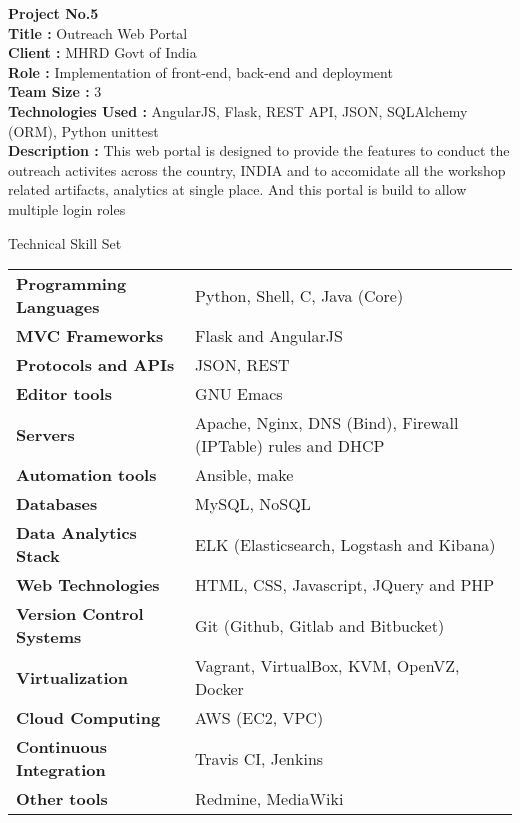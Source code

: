\documentclass{resume} %
\begin{document}
\bigskip
\textbf {Project No.5} \\
\textbf{Title : }  Outreach Web Portal\\
\textbf{Client : } MHRD Govt of India \\
\textbf{Role : } Implementation of front-end, back-end and deployment \\
\textbf{Team Size : } 3 \\
\textbf{Technologies Used :} AngularJS, Flask, REST API, JSON, SQLAlchemy (ORM), Python unittest \\
\textbf{Description :} This web portal is designed to provide the features to
conduct the outreach activites across the country, INDIA and
to accomidate all the workshop related artifacts, analytics
at single place. And this portal is build to allow multiple
login roles \\



\begin{rSection}
  {Technical Skill Set}

  \begin{tabular}{ @{} >{\bfseries}l @{\hspace{2ex}} l }
    Programming Languages & Python, Shell, C, Java (Core)
    \\ MVC Frameworks & Flask and AngularJS\\ Protocols and
    APIs & JSON, REST \\ Editor tools & GNU Emacs \\ Servers
    & Apache, Nginx, DNS (Bind), Firewall (IPTable) rules
    and DHCP \\ Automation tools & Ansible, make
    \\ Databases & MySQL, NoSQL \\ Data Analytics Stack &
    ELK (Elasticsearch, Logstash and Kibana) \\ Web
    Technologies & HTML, CSS, Javascript, JQuery and PHP
    \\ Version Control Systems & Git (Github, Gitlab and
    Bitbucket) \\ Virtualization & Vagrant, VirtualBox, KVM,
    OpenVZ, Docker \\ Cloud Computing & AWS (EC2, VPC)
    \\ Continuous Integration & Travis CI, Jenkins \\ Other
    tools & Redmine, MediaWiki
    
  \end{tabular}

\end{rSection}
\end{document}
